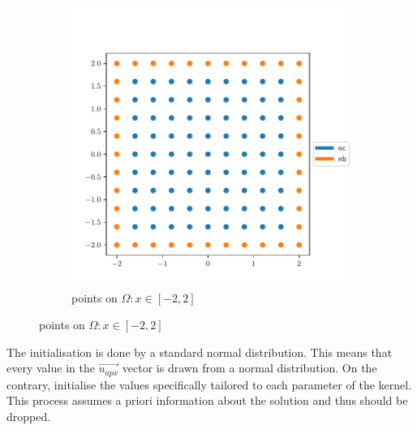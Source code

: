 \documentclass[./\jobname.tex]{subfiles}
\begin{document}
\begin{figure}[h]
\begin{subfigure}[b]{0.5\linewidth}
		\includegraphics[width=1\textwidth]{../img/pdf/testbed_big_domain.pdf}
		\caption{points on $\Omega: x\in [-2,2]$}
		\label{fig:collocation_points_domain_big}
	\end{subfigure}%
	\label{fig:collocation_points}
\end{figure}

The initialisation is done by a standard normal distribution. This means that every value in the $\vec{u_{apx}}$ vector is drawn from a normal distribution. On the contrary, \cite{chaquet_using_2019} initialise the values specifically tailored to each parameter of the kernel. This process assumes a priori information about the solution and thus should be dropped. 
\end{document}
